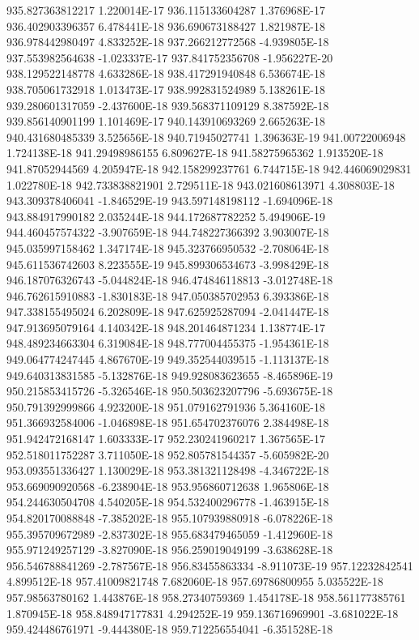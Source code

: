 935.827363812217  1.220014E-17
936.115133604287  1.376968E-17
936.402903396357  6.478441E-18
936.690673188427  1.821987E-18
936.978442980497  4.833252E-18
937.266212772568  -4.939805E-18
937.553982564638  -1.023337E-17
937.841752356708  -1.956227E-20
938.129522148778  4.633286E-18
938.417291940848  6.536674E-18
938.705061732918  1.013473E-17
938.992831524989  5.138261E-18
939.280601317059  -2.437600E-18
939.568371109129  8.387592E-18
939.856140901199  1.101469E-17
940.143910693269  2.665263E-18
940.431680485339  3.525656E-18
940.71945027741  1.396363E-19
941.00722006948  1.724138E-18
941.29498986155  6.809627E-18
941.58275965362  1.913520E-18
941.87052944569  4.205947E-18
942.158299237761  6.744715E-18
942.446069029831  1.022780E-18
942.733838821901  2.729511E-18
943.021608613971  4.308803E-18
943.309378406041  -1.846529E-19
943.597148198112  -1.694096E-18
943.884917990182  2.035244E-18
944.172687782252  5.494906E-19
944.460457574322  -3.907659E-18
944.748227366392  3.903007E-18
945.035997158462  1.347174E-18
945.323766950532  -2.708064E-18
945.611536742603  8.223555E-19
945.899306534673  -3.998429E-18
946.187076326743  -5.044824E-18
946.474846118813  -3.012748E-18
946.762615910883  -1.830183E-18
947.050385702953  6.393386E-18
947.338155495024  6.202809E-18
947.625925287094  -2.041447E-18
947.913695079164  4.140342E-18
948.201464871234  1.138774E-17
948.489234663304  6.319084E-18
948.777004455375  -1.954361E-18
949.064774247445  4.867670E-19
949.352544039515  -1.113137E-18
949.640313831585  -5.132876E-18
949.928083623655  -8.465896E-19
950.215853415726  -5.326546E-18
950.503623207796  -5.693675E-18
950.791392999866  4.923200E-18
951.079162791936  5.364160E-18
951.366932584006  -1.046898E-18
951.654702376076  2.384498E-18
951.942472168147  1.603333E-17
952.230241960217  1.367565E-17
952.518011752287  3.711050E-18
952.805781544357  -5.605982E-20
953.093551336427  1.130029E-18
953.381321128498  -4.346722E-18
953.669090920568  -6.238904E-18
953.956860712638  1.965806E-18
954.244630504708  4.540205E-18
954.532400296778  -1.463915E-18
954.820170088848  -7.385202E-18
955.107939880918  -6.078226E-18
955.395709672989  -2.837302E-18
955.683479465059  -1.412960E-18
955.971249257129  -3.827090E-18
956.259019049199  -3.638628E-18
956.546788841269  -2.787567E-18
956.83455863334  -8.911073E-19
957.12232842541  4.899512E-18
957.41009821748  7.682060E-18
957.69786800955  5.035522E-18
957.98563780162  1.443876E-18
958.27340759369  1.454178E-18
958.561177385761  1.870945E-18
958.848947177831  4.294252E-19
959.136716969901  -3.681022E-18
959.424486761971  -9.444380E-18
959.712256554041  -6.351528E-18
